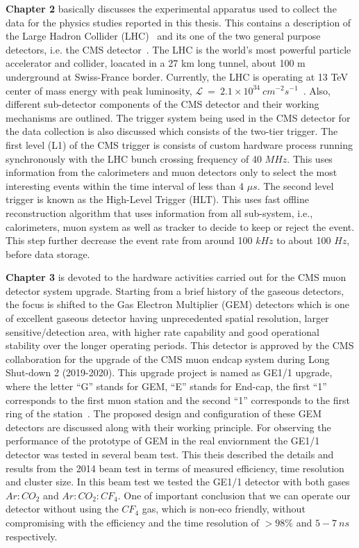 \textbf{Chapter 2} basically discusses the experimental apparatus used to collect the data for the physics studies reported in this thesis. This contains a description of the Large Hadron Collider (LHC)~\cite{LHC-tdr-vol2,LHC-tdr-vol3,LHC-tdr-vol1} and its one of the two general purpose detectors, i.e. the CMS detector~\cite{paper:JINST:CMSCollaboration}. The LHC is the world's most powerful particle accelerator and collider, loacated in a 27 km long tunnel, about 100 m underground at Swiss-France border. Currently, the LHC is operating at 13 TeV center of mass energy with peak luminosity, $\mathcal{L}~=~2.1 \times 10^{34}~cm^{-2}s^{-1}$~\cite{cms-lumi-public-results,Muratori2006}. Also, different sub-detector components of the CMS detector and their working mechanisms are outlined. The trigger system being used in the CMS detector for the data collection is also discussed which consists of the two-tier trigger. The first level (L1) of the CMS trigger is consists of custom hardware process running synchronously with the LHC bunch crossing frequency of 40 $MHz$. This uses information from the calorimeters and muon detectors only to select the most interesting events within the time interval of less than 4 $\mu s$. The second level trigger is known as the High-Level Trigger (HLT). This uses fast offline reconstruction algorithm that uses information from all sub-system, i.e., calorimeters, muon system as well as tracker to decide to keep or reject the event. This step further decrease the event rate from around 100 $kHz$ to about 100 $Hz$, before data storage.

\textbf{Chapter 3} is devoted to the hardware activities carried out for the CMS muon detector system upgrade. Starting from a brief history of the gaseous detectors, the focus is shifted to the Gas Electron Multiplier (GEM) detectors which is one of excellent gaseous detector having unprecedented spatial resolution, larger sensitive/detection area, with higher rate capability and good operational stability over the longer operating periods. This detector is approved by the CMS collaboration for the upgrade of the CMS muon endcap system during Long Shut-down 2 (2019-2020). This upgrade project is named as GE1/1 upgrade, where the letter ``G'' stands for GEM, ``E'' stands for End-cap, the first ``1'' corresponds to the first muon station and the second ``1'' corresponds to the first ring of the station~\cite{Colaleo:2021453}. The proposed design and configuration of these GEM detectors are discussed along with their working principle. For observing the performance of the prototype of GEM in the real enviornment the GE1/1 detector was tested in several beam test. This theis described the details and results from the 2014 beam test in terms of measured efficiency, time resolution and cluster size. In this beam test we tested the GE1/1 detector with both gases $Ar:CO_2$ and $Ar:CO_2:CF_4$. One of important conclusion that we can operate our detector without using the $CF_4$ gas, which is non-eco friendly, without compromising with the efficiency and the time resolution of $>98\%$ and $5-7~ns$ respectively.


